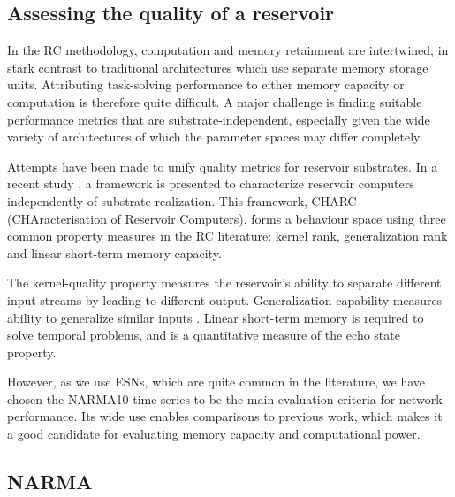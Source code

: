 


\subsection{Assessing the quality of a reservoir}

In the RC methodology, computation and memory retainment are intertwined, in
stark contrast to traditional architectures which use separate memory storage
units. Attributing task-solving performance to either memory capacity or
computation is therefore quite difficult. A major challenge is finding suitable
performance metrics that are substrate-independent, especially given the wide
variety of architectures of which the parameter spaces may differ completely.

Attempts have been made to unify quality metrics for reservoir substrates. In a
recent study \cite{dale_substrate-independent_2019}, a framework is presented to
characterize reservoir computers independently of substrate realization. This
framework, CHARC (CHAracterisation of Reservoir Computers), forms a behaviour
space using three common property measures in the RC literature: kernel rank,
generalization rank and linear short-term memory capacity.

The kernel-quality property \cite{legenstein_edge_2007} measures the reservoir's
ability to separate different input streams by leading to different output.
Generalization capability measures ability to generalize similar inputs
\cite{legenstein_edge_2007}. Linear short-term memory \cite{jaeger_short_2002}
is required to solve temporal problems, and is a quantitative measure of the
echo state property.

However, as we use ESNs, which are quite common in the literature, we have
chosen the NARMA10 time series to be the main evaluation criteria for network
performance. Its wide use enables comparisons to previous work, which makes it a
good candidate for evaluating memory capacity and computational power.

\subsection{NARMA}

